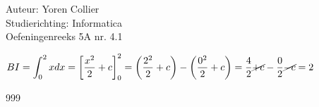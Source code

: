 \documentclass[a4paper]{article}
\newcommand{\Lh}{\left(} %
\newcommand{\Rh}{\right)}
\newcommand{\Lv}{\left[} %
\newcommand{\Rv}{\right]}
\newcommand{\schrap}{\cancel}
\newcommand{\intgrl}{\displaystyle\int} %
\begin{document}
\noindent \large Auteur: Yoren Collier \\
\noindent \large Studierichting: Informatica\\
\noindent \large Oefeningenreeks 5A nr. 4.1\\

\medskip

\normalsize

$ BI = \intgrl_0^2 x dx = \Lv \dfrac{x^2}{2} +c \Rv_0^2 = \Lh \dfrac{2^2}{2} +c \Rh - \Lh \dfrac{0^2}{2} +c \Rh = \dfrac{4}{2} \schrap{+c} - \dfrac{0}{2} \schrap{-c} = 2$\\

\begin{thebibliography}{999}
\end{thebibliography}
\end{document}
